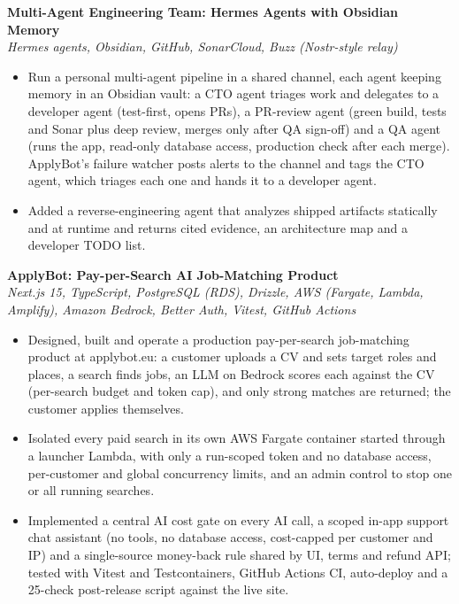 \documentclass{res} %
\begin{document}
\begin{resume}
  \textbf{Multi-Agent Engineering Team: Hermes Agents with Obsidian Memory} \\
  {\sl Hermes agents, Obsidian, GitHub, SonarCloud, Buzz (Nostr-style relay)} \smallskip
  \begin{itemize}
    \item Run a personal multi-agent pipeline in a shared channel, each agent keeping memory in an Obsidian vault: a CTO agent triages work and delegates to a developer agent (test-first, opens PRs), a PR-review agent (green build, tests and Sonar plus deep review, merges only after QA sign-off) and a QA agent (runs the app, read-only database access, production check after each merge). ApplyBot's failure watcher posts alerts to the channel and tags the CTO agent, which triages each one and hands it to a developer agent.
    \item Added a reverse-engineering agent that analyzes shipped artifacts statically and at runtime and returns cited evidence, an architecture map and a developer TODO list.
  \end{itemize}
  \vspace{6pt}

  \textbf{ApplyBot: Pay-per-Search AI Job-Matching Product} \\
  {\sl Next.js 15, TypeScript, PostgreSQL (RDS), Drizzle, AWS (Fargate, Lambda, Amplify), Amazon Bedrock, Better Auth, Vitest, GitHub Actions} \smallskip
  \begin{itemize}
    \item Designed, built and operate a production pay-per-search job-matching product at applybot.eu: a customer uploads a CV and sets target roles and places, a search finds jobs, an LLM on Bedrock scores each against the CV (per-search budget and token cap), and only strong matches are returned; the customer applies themselves.
    \item Isolated every paid search in its own AWS Fargate container started through a launcher Lambda, with only a run-scoped token and no database access, per-customer and global concurrency limits, and an admin control to stop one or all running searches.
    \item Implemented a central AI cost gate on every AI call, a scoped in-app support chat assistant (no tools, no database access, cost-capped per customer and IP) and a single-source money-back rule shared by UI, terms and refund API; tested with Vitest and Testcontainers, GitHub Actions CI, auto-deploy and a 25-check post-release script against the live site.
  \end{itemize}
  \vspace{6pt}


\end{resume}
\end{document}
